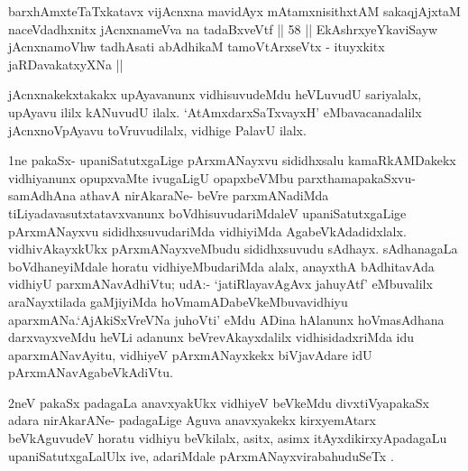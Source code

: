 \begin{shl}
barxhAmxteTaTxkatavx vijAcnxna mavidAyx mAtamxnisithxtAM
sakaqjAjxtaM naceVdadhxnitx jAcnxnameVva na tadaBxveVtf || 58 ||
EkAshrxyeYkaviSayw jAcnxnamoVhw tadhAsati
abAdhikaM tamoV\s tArxseVtx - ituyxkitx jaRDavakatxyXNa ||
\end{shl}

\begin{artha}
jAcnxnakekxtakakx upAyavanunx vidhisuvudeMdu heVLuvudU sariyalalx,
\-upAyavu ililx kANuvudU ilalx. `AtAmxdarxSaTxvayxH' eMbavacanadalilx 
\-jAcnxnoVpAyavu toVruvudilalx, vidhige PalavU ilalx.
\end{artha}

\centerline{}

\begin{artha}
1ne pakaSx- upaniSatutxgaLige pArxmANayxvu sididhxsalu kamaRkAMDakekx
vidhi\-yanunx opupxvaMte ivugaLigU opapxbeVMbu parxthamapakaSxvu-
samAdhAna athavA nirAkaraNe- beVre parxmANadiMda
tiLiyadavasutxtatavxvanunx boVdhisuvudariMdaleV upaniSatutx\-gaLige
pArxmANayxvu sididhxsuvudariMda vidhiyiMda
AgabeVkAdadidxlalx. vidhivAkayxkUkx pArxmANayxveMbudu sididhxsuvudu
sAdhayx. sAdhanagaLa boVdhaneyiMdale \-horatu vidhiyeMbudariMda alalx,
anayxthA bAdhitavAda vidhiyU parxmANavAdhiVtu; \break udA:- `jatiRlayavAgAvx ja{\null}huyAtf'
eMbuvalilx araNayxtilada gaMjiyiMda \break hoVmamADabeVkeMbuvavidhiyu
aparxmANa.`AjAkiSxVreVNa juhoVti' eMdu \-ADina hAlanunx hoVmasAdhana darxvayxveMdu
heVLi adanunx beVrevAkayxdalilx vidhisidadx\-riMda idu aparxmANavAyitu,
vidhiyeV pArxmANayxkekx biVjavAdare idU \break pArxmANavAgabeVkAdiVtu.
\end{artha}

\begin{artha}
2neV pakaSx padagaLa anavxyakUkx vidhiyeV beVkeMdu divxtiVyapakaSx adara nirAkarANe- padagaLige Aguva anavxyakekx kirxyemAtarx beVkAguvudeV horatu vidhiyu beVkilalx, asitx, asimx itAyxdikirxyApadagaLu upaniSatutxgaLalUlx ive, adariMdale pArxmANayxvirabahuduSeTx .
\end{artha}


